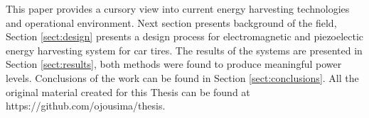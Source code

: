 This paper provides a cursory view into current energy harvesting technologies and operational environment. Next section presents background of the field, Section \ref{sect:design} presents a design process for electromagnetic and piezoelectic energy harvesting system for car tires. The results of the systems are presented in Section \ref{sect:results}, both methods were found to produce meaningful power levels. Conclusions of the work can be found in Section \ref{sect:conclusions}. All the original material created for this Thesis can be found at https://github.com/ojousima/thesis. 
